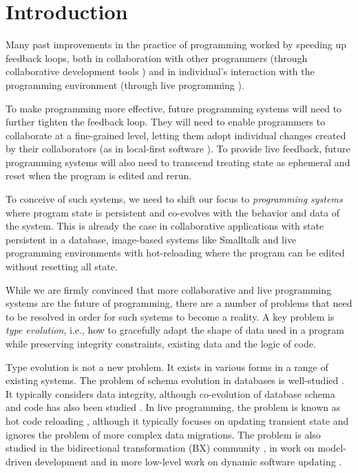 \documentclass[english,submission]{programming}
\begin{document}
\section{Introduction}

Many past improvements in the practice of programming worked by speeding up feedback loops,
both in collaboration with other programmers (through collaborative development tools
\cite{goldman2011real,kurniawan2015coder,replit}) and in individual's interaction with the
programming environment (through live programming \cite{rein2018exploratory}).

To make programming more effective, future programming systems will need to further tighten
the feedback loop. They will need to enable programmers to collaborate at a fine-grained level,
letting them adopt individual changes created by their collaborators (as in local-first software
\cite{localfirst}). To provide live feedback, future programming systems will also need to
transcend treating state as ephemeral and reset when the
program is edited and rerun.

To conceive of such systems, we need to shift our focus to \emph{programming systems} \cite{techdims}
where program state is persistent and co-evolves with the behavior and data of the system. This is
already the case in collaborative applications with state persistent in a database, image-based
systems like Smalltalk and live programming environments with hot-reloading where the program can
be edited without resetting all state.

While we are firmly convinced that more collaborative and live programming systems are the
future of programming, there are a number of problems that need to be resolved in order for
such systems to become a reality. A key problem is \emph{type evolution}, i.e., how to
gracefully adapt the shape of data used in a program while preserving integrity
constraints, existing data and the logic of code.

Type evolution is not a new problem. It exists in various forms in a range of existing systems.
The problem of schema evolution in databases is well-studied \cite{erhard06}.
It typically considers data integrity, although co-evolution of database schema
and code has also been studied \cite{Cleve2006,wang19}.
In live programming, the problem is known as hot code reloading \cite{barenz2020essence,beckmann2021shortening},
although it typically focuses on updating transient state and ignores the problem of more complex
data migrations. The problem is also studied in the bidirectional transformation (BX)
community \cite{czarnecki2009bidirectional}, in work on model-driven development
\cite{Cicchetti11,alanen2003} and in more low-level work on dynamic software updating
\cite{hicks2005dynamic}.
\end{document}

